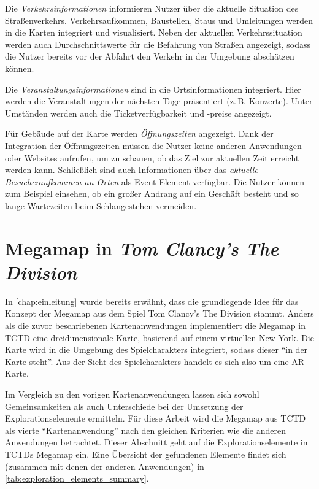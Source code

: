 Die \emph{Verkehrsinformationen} informieren Nutzer über die aktuelle Situation des Straßenverkehrs.
Verkehrsaufkommen, Baustellen, Staus und Umleitungen werden in die Karten integriert und visualisiert.
Neben der aktuellen Verkehrssituation werden auch Durchschnittswerte für die Befahrung von Straßen angezeigt, sodass die Nutzer bereits vor der Abfahrt den Verkehr in der Umgebung abschätzen können.

Die \emph{Veranstaltungsinformationen} sind in die Ortsinformationen integriert.
Hier werden die Veranstaltungen der nächsten Tage präsentiert (z.\,B. Konzerte).
Unter Umständen werden auch die Ticketverfügbarkeit und -preise angezeigt.

Für Gebäude auf der Karte werden \emph{Öffnungszeiten} angezeigt.
Dank der Integration der Öffnungszeiten müssen die Nutzer keine anderen Anwendungen oder Websites aufrufen, um zu schauen, ob das Ziel zur aktuellen Zeit erreicht werden kann.
Schließlich sind auch Informationen über das \emph{aktuelle Besucheraufkommen an Orten} als Event-Element verfügbar.
Die Nutzer können zum Beispiel einsehen, ob ein großer Andrang auf ein Geschäft besteht und so lange Wartezeiten beim Schlangestehen vermeiden.

\section{Megamap in \emph{Tom Clancy's The Division}}
In \autoref{chap:einleitung} wurde bereits erwähnt, dass die grundlegende Idee für das Konzept der Megamap aus dem Spiel Tom Clancy's The Division stammt.
Anders als die zuvor beschriebenen Kartenanwendungen implementiert die Megamap in TCTD eine dreidimensionale Karte, basierend auf einem virtuellen New York.
Die Karte wird in die Umgebung des Spielcharakters integriert, sodass dieser \enquote{in der Karte steht}.
Aus der Sicht des Spielcharakters handelt es sich also um eine AR-Karte.

Im Vergleich zu den vorigen Kartenanwendungen lassen sich sowohl Gemeinsamkeiten als auch Unterschiede bei der Umsetzung der Explorationselemente ermitteln.
Für diese Arbeit wird die Megamap aus TCTD als vierte \enquote{Kartenanwendung} nach den gleichen Kriterien wie die anderen Anwendungen betrachtet.
Dieser Abschnitt geht auf die Explorationselemente in TCTDs Megamap ein.
Eine Übersicht der gefundenen Elemente findet sich (zusammen mit denen der anderen Anwendungen) in \autoref{tab:exploration_elements_summary}.

